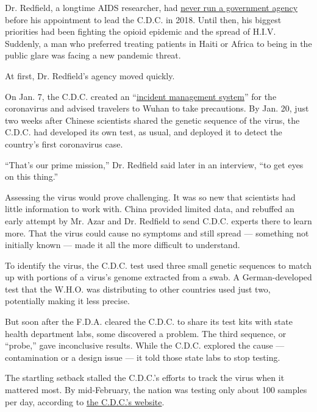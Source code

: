 Dr. Redfield, a longtime AIDS researcher, had
\href{https://www.nytimes3xbfgragh.onion/2018/03/21/health/cdc-robert-redfield-aids.html}{never
run a government agency} before his appointment to lead the C.D.C. in
2018. Until then, his biggest priorities had been fighting the opioid
epidemic and the spread of H.I.V. Suddenly, a man who preferred treating
patients in Haiti or Africa to being in the public glare was facing a
new pandemic threat.

At first, Dr. Redfield's agency moved quickly.

On Jan. 7, the C.D.C. created an
``\href{https://www.who.int/docs/default-source/coronaviruse/situation-reports/20200123-sitrep-3-2019-ncov.pdf}{incident
management system}'' for the coronavirus and advised travelers to Wuhan
to take precautions. By Jan. 20, just two weeks after Chinese scientists
shared the genetic sequence of the virus, the C.D.C. had developed its
own test, as usual, and deployed it to detect the country's first
coronavirus case.

``That's our prime mission,'' Dr. Redfield said later in an interview,
``to get eyes on this thing.''

Assessing the virus would prove challenging. It was so new that
scientists had little information to work with. China provided limited
data, and rebuffed an early attempt by Mr. Azar and Dr. Redfield to send
C.D.C. experts there to learn more. That the virus could cause no
symptoms and still spread --- something not initially known --- made it
all the more difficult to understand.

To identify the virus, the C.D.C. test used three small genetic
sequences to match up with portions of a virus's genome extracted from a
swab. A German-developed test that the W.H.O. was distributing to other
countries used just two, potentially making it less precise.

But soon after the F.D.A. cleared the C.D.C. to share its test kits with
state health department labs, some discovered a problem. The third
sequence, or ``probe,'' gave inconclusive results. While the C.D.C.
explored the cause --- contamination or a design issue --- it told those
state labs to stop testing.

The startling setback stalled the C.D.C.'s efforts to track the virus
when it mattered most. By mid-February, the nation was testing only
about 100 samples per day, according to
\href{https://www.cdc.gov/coronavirus/2019-ncov/cases-updates/testing-in-us.html}{the
C.D.C.'s website}.

